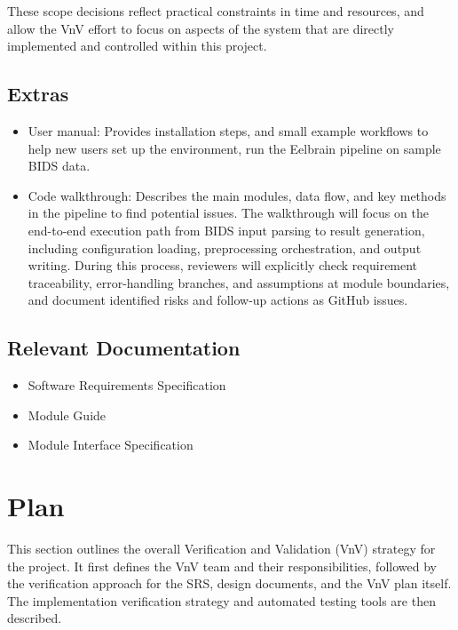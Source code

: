\documentclass[12pt, titlepage]{article}
\begin{document}
These scope decisions reflect practical constraints in time and resources, and allow the VnV effort to focus on aspects of the system that are directly implemented and controlled within this project.




\subsection{Extras}


\begin{itemize}
    \item User manual: Provides installation steps, and small example workflows to help new users set up the environment, run the Eelbrain pipeline on sample BIDS data.
    \item Code walkthrough: Describes the main modules, data flow, and key methods in the pipeline to find potential issues. The walkthrough will focus on the end-to-end execution path from BIDS input parsing to result generation, including configuration loading, preprocessing orchestration, and output writing. During this process, reviewers will explicitly check requirement traceability, error-handling branches, and assumptions at module boundaries, and document identified risks and follow-up actions as GitHub issues.
\end{itemize}


\subsection{Relevant Documentation}


\begin{itemize}
    \item Software Requirements Specification \citep{SRS}
    \item Module Guide \citep{MG}
    \item Module Interface Specification \citep{MIS}
\end{itemize}









\section{Plan}


This section outlines the overall Verification and Validation (VnV) strategy for the project. It first defines the VnV team and their responsibilities, followed by the verification approach for the SRS, design documents, and the VnV plan itself. The implementation verification strategy and automated testing tools are then described.
\end{document}

